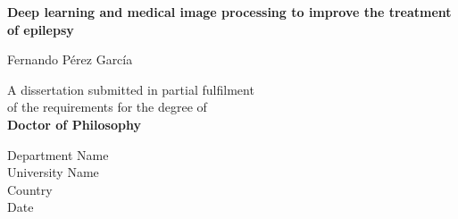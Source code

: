\begin{titlepage}
    \begin{center}

        \vspace*{1cm}

        \LARGE
        \textbf{Deep learning and medical
        image processing to improve the
        treatment of epilepsy}

        \vspace{1.5cm}

        \Large

        Fernando Pérez García


        \vfill


        \normalsize
        A dissertation submitted in partial fulfilment \\
        of the requirements for the degree of \\
        \textbf{Doctor of Philosophy}


        \vspace{0.8cm}


        \Large
        Department Name\\
        University Name\\
        Country\\
        Date

    \end{center}
\end{titlepage}
